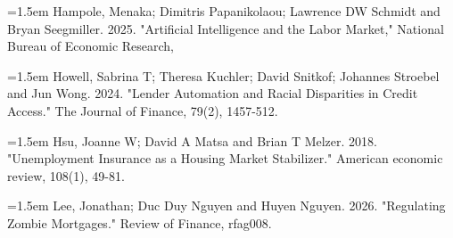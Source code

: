 \documentclass[11pt,a4paper]{article}
\begin{document}
\noindent\hangindent=1.5em Hampole, Menaka; Dimitris Papanikolaou; Lawrence DW Schmidt and Bryan Seegmiller. 2025. "Artificial Intelligence and the Labor Market," National Bureau of Economic Research,\par
\noindent\hangindent=1.5em Howell, Sabrina T; Theresa Kuchler; David Snitkof; Johannes Stroebel and Jun Wong. 2024. "Lender Automation and Racial Disparities in Credit Access." The Journal of Finance, 79(2), 1457-512.\par
\noindent\hangindent=1.5em Hsu, Joanne W; David A Matsa and Brian T Melzer. 2018. "Unemployment Insurance as a Housing Market Stabilizer." American economic review, 108(1), 49-81.\par
\noindent\hangindent=1.5em Lee, Jonathan; Duc Duy Nguyen and Huyen Nguyen. 2026. "Regulating Zombie Mortgages." Review of Finance, rfag008.\par
\end{document}
